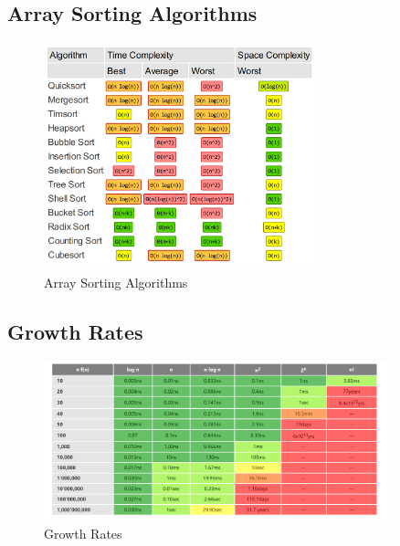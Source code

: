 \subsection{Array Sorting Algorithms}
\begin{figure}[H] %
\centering %
\includegraphics[width=0.7\textwidth]{images_content/2.png} %
\caption{Array Sorting Algorithms} %
\end{figure}

\subsection{Growth Rates}
\begin{figure}[H] %
\centering %
\includegraphics[width=0.9\textwidth]{images_content/3.png} %
\caption{Growth Rates} %
\end{figure}